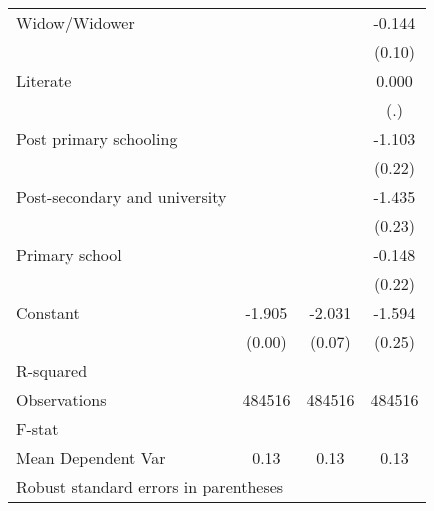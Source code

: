 {\begin{tabular}{l*{3}{c}}
Widow/Widower       &                     &                     &      -0.144         \\
                    &                     &                     &      (0.10)         \\
Literate            &                     &                     &       0.000         \\
                    &                     &                     &         (.)         \\
Post primary schooling&                     &                     &      -1.103\sym{***}\\
                    &                     &                     &      (0.22)         \\
Post-secondary and university&                     &                     &      -1.435\sym{***}\\
                    &                     &                     &      (0.23)         \\
Primary school      &                     &                     &      -0.148         \\
                    &                     &                     &      (0.22)         \\
Constant            &      -1.905\sym{***}&      -2.031\sym{***}&      -1.594\sym{***}\\
                    &      (0.00)         &      (0.07)         &      (0.25)         \\
\hline
R-squared           &                     &                     &                     \\
Observations        &      484516         &      484516         &      484516         \\
F-stat              &                     &                     &                     \\
Mean Dependent Var  &        0.13         &        0.13         &        0.13         \\
\hline\hline
\multicolumn{4}{l}{\footnotesize Robust standard errors in parentheses}\\
\end{tabular}
}
